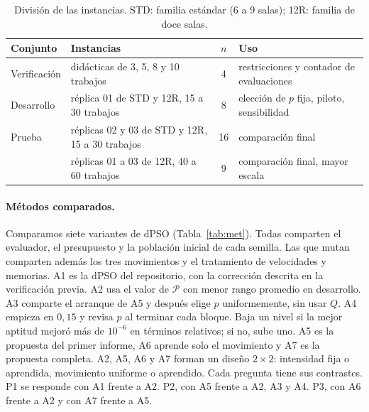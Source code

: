\documentclass[10pt,a4paper]{article}
\newcommand{\dc}{{,}}%
\begin{document}
\begin{table}[htb]
\centering\small
\caption{División de las instancias. STD: familia estándar (6 a 9 salas); 12R: familia de doce salas.}
\label{tab:inst}
\begin{tabular}{@{}llcl@{}}
\toprule
Conjunto & Instancias & $n$ & Uso \\
\midrule
Verificación & didácticas de 3, 5, 8 y 10 trabajos & 4 & restricciones y contador de evaluaciones \\
Desarrollo & réplica 01 de STD y 12R, 15 a 30 trabajos & 8 & elección de $p$ fija, piloto, sensibilidad \\
Prueba & réplicas 02 y 03 de STD y 12R, 15 a 30 trabajos & 16 & comparación final \\
       & réplicas 01 a 03 de 12R, 40 a 60 trabajos & 9 & comparación final, mayor escala \\
\bottomrule
\end{tabular}
\end{table}

\paragraph{Métodos comparados.}
Comparamos siete variantes de dPSO (Tabla~\ref{tab:met}). Todas comparten el evaluador, el presupuesto y la población inicial de cada semilla. Las que
mutan comparten además los tres movimientos y el tratamiento de velocidades y memorias. A1 es
la dPSO del repositorio, con la corrección descrita en la verificación previa. A2 usa el valor de $\mathcal{P}$ con menor rango promedio en
desarrollo. A3 comparte el arranque de A5 y después elige $p$ uniformemente, sin usar $Q$. A4
empieza en $0\dc15$ y revisa $p$ al terminar cada bloque. Baja un nivel si la mejor aptitud
mejoró más de $10^{-6}$ en términos relativos; si no, sube uno. A5 es la propuesta del primer
informe, A6 aprende solo el movimiento y A7 es la propuesta completa. A2, A5, A6 y A7 forman un
diseño $2\times2$: intensidad fija o aprendida, movimiento uniforme o aprendido. Cada pregunta
tiene sus contrastes. P1 se responde con A1 frente a A2. P2, con A5 frente a A2, A3 y A4. P3,
con A6 frente a A2 y con A7 frente a A5.
\end{document}
